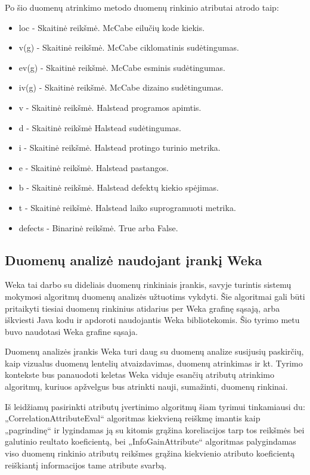 \documentclass{VUMIFPSbakalaurinis}
\begin{document}
Po šio duomenų atrinkimo metodo duomenų rinkinio atributai atrodo taip:
\begin{itemize} 
\item[] loc - Skaitinė reikšmė. McCabe eilučių kode kiekis.
\item[] v(g) - Skaitinė reikšmė. McCabe ciklomatinis sudėtingumas.
\item[] ev(g) - Skaitinė reikšmė. McCabe esminis sudėtingumas.
\item[] iv(g) - Skaitinė reikšmė. McCabe dizaino sudėtingumas.
\item[] v - Skaitinė reikšmė. Halstead programos apimtis.
\item[] d - Skaitinė reikšmė Halstead sudėtingumas.
\item[] i - Skaitinė reikšmė. Halstead protingo turinio metrika.
\item[] e - Skaitinė reikšmė. Halstead pastangos.
\item[] b - Skaitinė reikšmė. Halstead defektų kiekio spėjimas.
\item[] t - Skaitinė reikšmė. Halstead laiko suprogramuoti metrika.
\item[] defects - Binarinė reikšmė. True arba False.
\end{itemize} 


\subsection{Duomenų analizė naudojant įrankį Weka}

Weka tai darbo su dideliais duomenų rinkiniais įrankis, savyje turintis sistemų mokymosi algoritmų duomenų analizės užtuotims vykdyti. Šie algoritmai gali būti pritaikyti tiesiai duomenų rinkinius atidarius per Weka grafinę sąsają, arba iškviesti Java kodu ir apdoroti naudojantis Weka bibliotekomis.  Šio tyrimo metu buvo naudotasi Weka grafine sąsaja.

Duomenų analizės įrankis Weka \cite{hall09:_weka_data_minin_softw} turi daug su duomenų analize susijusių paskirčių, kaip vizualus duomenų lentelių atvaizdavimas, duomenų atrinkimas ir kt. Tyrimo kontekste bus panauodoti keletas Weka viduje esančių atributų atrinkimo algoritmų, kuriuos apžvelgus bus atrinkti nauji, sumažinti, duomenų rinkinai.

Iš leidžiamų pasirinkti atributų įvertinimo algoritmų šiam tyrimui tinkamiausi du: „CorrelationAttributeEval“ algoritmas kiekvieną reiškmę imantis kaip „pagrindinę“ ir lygindamas ją su kitomis grąžina koreliacijos tarp tos reikšmės bei galutinio reultato koeficientą, bei „InfoGainAttribute“ algoritmas palygindamas viso duomenų rinkinio atributų reikšmes grąžina kiekvienio atributo koeficientą reiškiantį informacijos tame atribute svarbą.
\end{document}
